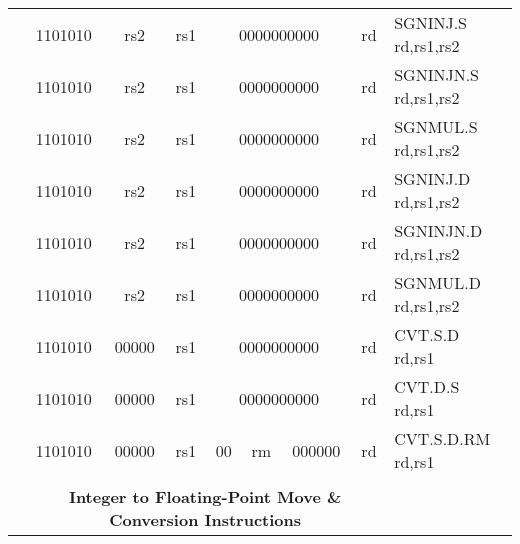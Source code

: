 \begin{table}[p]
\begin{small}
\begin{center}
\begin{tabular}{rcccccccccccl}
&
\multicolumn{2}{|c|}{1101010} &
\multicolumn{1}{c|}{rs2} &
\multicolumn{1}{c|}{rs1} &
\multicolumn{6}{c|}{0000000000} &
\multicolumn{1}{c|}{rd} & SGNINJ.S rd,rs1,rs2 \\
\cline{2-12}
  

&
\multicolumn{2}{|c|}{1101010} &
\multicolumn{1}{c|}{rs2} &
\multicolumn{1}{c|}{rs1} &
\multicolumn{6}{c|}{0000000000} &
\multicolumn{1}{c|}{rd} & SGNINJN.S rd,rs1,rs2 \\
\cline{2-12}
  

&
\multicolumn{2}{|c|}{1101010} &
\multicolumn{1}{c|}{rs2} &
\multicolumn{1}{c|}{rs1} &
\multicolumn{6}{c|}{0000000000} &
\multicolumn{1}{c|}{rd} & SGNMUL.S rd,rs1,rs2 \\
\cline{2-12}
  

&
\multicolumn{2}{|c|}{1101010} &
\multicolumn{1}{c|}{rs2} &
\multicolumn{1}{c|}{rs1} &
\multicolumn{6}{c|}{0000000000} &
\multicolumn{1}{c|}{rd} & SGNINJ.D rd,rs1,rs2 \\
\cline{2-12}
  

&
\multicolumn{2}{|c|}{1101010} &
\multicolumn{1}{c|}{rs2} &
\multicolumn{1}{c|}{rs1} &
\multicolumn{6}{c|}{0000000000} &
\multicolumn{1}{c|}{rd} & SGNINJN.D rd,rs1,rs2 \\
\cline{2-12}
  

&
\multicolumn{2}{|c|}{1101010} &
\multicolumn{1}{c|}{rs2} &
\multicolumn{1}{c|}{rs1} &
\multicolumn{6}{c|}{0000000000} &
\multicolumn{1}{c|}{rd} & SGNMUL.D rd,rs1,rs2 \\
\cline{2-12}
  

&
\multicolumn{2}{|c|}{1101010} &
\multicolumn{1}{c|}{00000} &
\multicolumn{1}{c|}{rs1} &
\multicolumn{6}{c|}{0000000000} &
\multicolumn{1}{c|}{rd} & CVT.S.D rd,rs1 \\
\cline{2-12}
  

&
\multicolumn{2}{|c|}{1101010} &
\multicolumn{1}{c|}{00000} &
\multicolumn{1}{c|}{rs1} &
\multicolumn{6}{c|}{0000000000} &
\multicolumn{1}{c|}{rd} & CVT.D.S rd,rs1 \\
\cline{2-12}
  

&
\multicolumn{2}{|c|}{1101010} &
\multicolumn{1}{c|}{00000} &
\multicolumn{1}{c|}{rs1} &
\multicolumn{1}{c|}{00} &
\multicolumn{2}{c|}{rm} &
\multicolumn{3}{c|}{000000} &
\multicolumn{1}{c|}{rd} & CVT.S.D.RM rd,rs1 \\
\cline{2-12}
  

&
\multicolumn{11}{c}{} & \\
&
\multicolumn{11}{c}{\bf Integer to Floating-Point Move \& Conversion Instructions} & \\
\cline{2-12}
  


\end{tabular}
\end{center}
\end{small}
\end{table}
